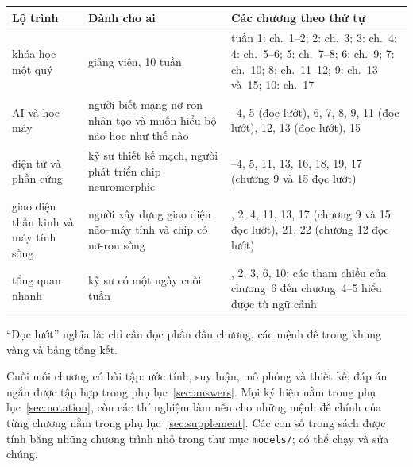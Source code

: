 \begin{center}
\footnotesize
\setlength{\tabcolsep}{4pt}
\renewcommand{\arraystretch}{1.2}
\begin{tabular}{>{\raggedright}p{3.0cm}>{\raggedright}p{3.9cm}>{\raggedright\arraybackslash}p{6.4cm}}
\toprule
Lộ trình & Dành cho ai & Các chương theo thứ tự \\
\midrule
khóa học một quý & giảng viên, 10 tuần & tuần 1: ch.~1--2; 2: ch.~3; 3: ch.~4; 4: ch.~5--6; 5: ch.~7--8; 6: ch.~9; 7: ch.~10; 8: ch.~11--12; 9: ch.~13 và~15; 10: ch.~17 \\
AI và học máy & người biết mạng nơ-ron nhân tạo và muốn hiểu bộ não học như thế nào & 1--4, 5 (đọc lướt), 6, 7, 8, 9, 11 (đọc lướt), 12, 13 (đọc lướt), 15 \\
điện tử và phần cứng & kỹ sư thiết kế mạch, người phát triển chip neuromorphic & 1--4, 5, 11, 13, 16, 18, 19, 17 (chương 9 và 15 đọc lướt) \\
giao diện thần kinh và máy tính sống & người xây dựng giao diện não--máy tính và chip có nơ-ron sống & 1, 2, 4, 11, 13, 17 (chương 9 và 15 đọc lướt), 21, 22 (chương 12 đọc lướt) \\
tổng quan nhanh & kỹ sư có một ngày cuối tuần & 1, 2, 3, 6, 10; các tham chiếu của chương~6 đến chương~4--5 hiểu được từ ngữ cảnh \\
\bottomrule
\end{tabular}
\end{center}

``Đọc lướt'' nghĩa là: chỉ cần đọc phần đầu chương, các mệnh đề trong khung vàng và bảng tổng kết.

Cuối mỗi chương có bài tập: ước tính, suy luận, mô phỏng và thiết kế; đáp án ngắn được tập hợp trong phụ lục~\ref{sec:answers}. Mọi ký hiệu nằm trong phụ lục~\ref{sec:notation}, còn các thí nghiệm làm nền cho những mệnh đề chính của từng chương nằm trong phụ lục~\ref{sec:supplement}. Các con số trong sách được tính bằng những chương trình nhỏ trong thư mục \texttt{models/}; có thể chạy và sửa chúng.
